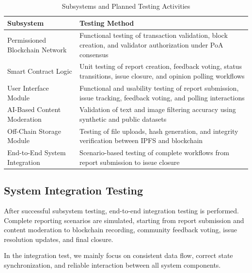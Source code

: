 \begin{table}[h!]
\centering
\small
\renewcommand{\arraystretch}{1.4}
\caption{Subsystems and Planned Testing Activities}
\label{tab:testing-plan}
\begin{tabular}{|p{5.5cm}|p{7.5cm}|}
\hline
\textbf{Subsystem} & \textbf{Testing Method} \\ \hline

Permissioned Blockchain Network &
Functional testing of transaction validation, block creation, and validator authorization under PoA consensus \\ \hline

Smart Contract Logic &
Unit testing of report creation, feedback voting, status transitions, issue closure, and opinion polling workflows \\ \hline

User Interface Module &
Functional and usability testing of report submission, issue tracking, feedback voting, and polling interactions \\ \hline

AI-Based Content Moderation &
Validation of text and image filtering accuracy using synthetic and public datasets \\ \hline

Off-Chain Storage Module &
Testing of file uploads, hash generation, and integrity verification between IPFS and blockchain \\ \hline

End-to-End System Integration &
Scenario-based testing of complete workflows from report submission to issue closure  \\ \hline

\end{tabular}
\end{table}

\subsection{System Integration Testing}

After successful subsystem testing, end-to-end integration testing is performed.
Complete reporting scenarios are simulated, starting from report submission and
content moderation to blockchain recording, community feedback voting, issue
resolution updates, and final closure.

In the integration test, we mainly focus on  consistent data flow, correct state
synchronization, and reliable interaction between all system components.

